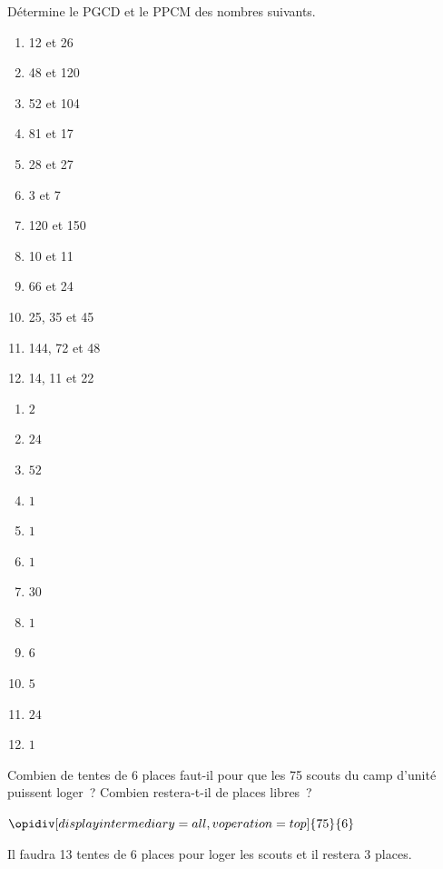 \documentclass[../../syllabus_2.tex]{subfiles}
\begin{document}
\begin{exercise}
    Détermine le PGCD et le PPCM des nombres suivants.
    \begin{enumerate}[cols=4]
        \item 12 et 26
        \item 48 et 120
        \item 52 et 104
        \item 81 et 17
        \item 28 et 27
        \item 3 et 7
        \item 120 et 150
        \item 10 et 11
        \item 66 et 24
        \item 25, 35 et 45
        \item 144, 72 et 48
        \item 14, 11 et 22
    \end{enumerate}
\end{exercise}
\begin{solution}
    \begin{enumerate}
        \item \(2\)
        \item \(24\)
        \item \(52\)
        \item \(1\)
        \item \(1\)
        \item \(1\)
        \item \(30\)
        \item \(1\)
        \item \(6\)
        \item \(5\)
        \item \(24\)
        \item \(1\)
    \end{enumerate}
\end{solution}

\begin{exercise}
    Combien de tentes de 6 places faut-il pour que les 75 scouts du camp d'unité puissent loger~? Combien restera-t-il de places libres~?
\end{exercise}
\begin{solution}
    $\opidiv[displayintermediary=all,voperation=top]{75}{6}$

    Il faudra 13 tentes de 6 places pour loger les scouts et il restera 3 places.
\end{solution}
\end{document}
